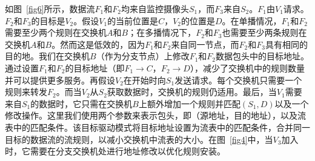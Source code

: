 
如图~\ref{fig6}所示，数据流$F_{1}$和$F_{2}$均来自监控摄像头$S_{1}$，而$F_{3}$来自$S_{2}$。$F_{1}$由$V_{1}$请求。$F_{2}$和$F_{3}$的目标是$V_{2}$。假设$V_{1}$的当前位置是$C$，$V_{2}$的位置是$D$。在单播情况，$F_{1}$和$F_{2}$需要至少两个规则在交换机$A$和$B$；在多播情况下，$F_{2}$和$F_{3}$也需要至少两条规则在交换机$A$和$B$。然而这是低效的，因为$F_{1}$和$F_{2}$来自同一节点，而$F_{2}$和$F_{3}$具有相同的目的地。我们在交换机$B$（作为分支节点）上修改$F_{1}$和$F_{2}$数据包头中的目标地址。通过设置$F_{1}$和$F_{2}$的目标地址（即$F_{1} \to C$，$F_{2} \to D$），减少了交换机中的规则数量并可以提供更多服务。再假设$V_{2}$在开始时向$S_{1}$发送请求。每个交换机只需要一个规则来转发$F_{2}$。而当$V_{2}$从$S_{2}$获取数据时，交换机的规则仍适用。最后，当$V_{1}$需要来自$S_{1}$的数据时，它只需在交换机$B$上额外增加一个规则并匹配$(S_ {1},D)$以及一个修改操作。这里我们使用两个参数来表示包头，即（源地址，目的地址），以及流表中的匹配条件。该目标驱动模式将目标地址设置为流表中的匹配条件，合并同一目标的数据流的流规则，以减小交换机中流表的大小。在图~\ref{fig4}中，当$V_ {3}$加入时，它需要在分支交换机处进行地址修改以优化规则安装。

